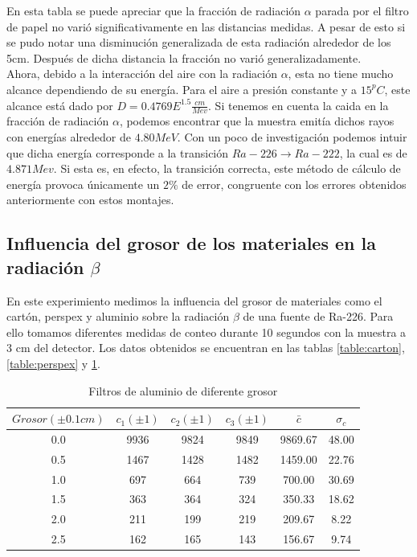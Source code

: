 \documentclass[%
 reprint,
 amsmath,amssymb,
 aps,
]{revtex4-1}
\begin{document}
En esta tabla se puede apreciar que la fracción de radiación $\alpha$ parada por el filtro de papel no varió significativamente en las distancias medidas. A pesar de esto si se pudo notar una disminución generalizada de esta radiación alrededor de los 5cm. Después de dicha distancia la fracción no varió generalizadamente. \\

Ahora, debido a la interacción del aire con la radiación $\alpha$, esta no tiene mucho alcance dependiendo de su energía. Para el aire a presión constante y a $15^pC$, este alcance está dado por $D= 0.4769 E^{1.5}\frac{cm}{Mev}$. Si tenemos en cuenta la caida en la fracción de radiación $\alpha$, podemos encontrar que la muestra emitía dichos rayos con energías alrededor de $4.80 MeV$. Con un poco de investigación podemos intuir que dicha energía corresponde a la transición $Ra-226 \rightarrow Ra-222$, la cual es de $4.871Mev$. Si esta es, en efecto, la transición correcta, este método de cálculo de energía provoca únicamente un $2\%$ de error, congruente con los errores obtenidos anteriormente con estos montajes.\\

\subsection{\label{sec:level2}Influencia del grosor de los materiales en la radiación $\beta$}
En este experimiento medimos la influencia del grosor de materiales como el cartón, perspex y aluminio sobre la radiación $\beta$ de una fuente de Ra-226. Para ello tomamos diferentes medidas de conteo durante 10 segundos con la muestra a 3 cm del detector. Los datos obtenidos se encuentran en las tablas \ref{table:carton}, \ref{table:perspex} y \ref{table:aluminio}.\\

\begin{table}[h!]
\centering
 \begin{tabular}{|c|c|c|c|c|c|} 
 \hline
 $Grosor(\pm0.1cm)$ & $c_1(\pm1)$ & $c_2(\pm1)$ & $c_3(\pm1)$ & $\bar{c}$ & $\sigma_c$ \\ [0.5ex] 
 \hline\hline
 0.0&9936&9824&9849&9869.67&48.00\\
 0.5&1467&1428&1482&1459.00&22.76\\
 1.0&697&664&739&700.00&30.69\\
 1.5&363&364&324&350.33&18.62\\
 2.0&211&199&219&209.67&8.22\\
 2.5&162&165&143&156.67&9.74\\
[1ex] 
 \hline
 \end{tabular}
 \caption{Filtros de aluminio de diferente grosor}
 \label{table:aluminio}
\end{table}
\end{document}

